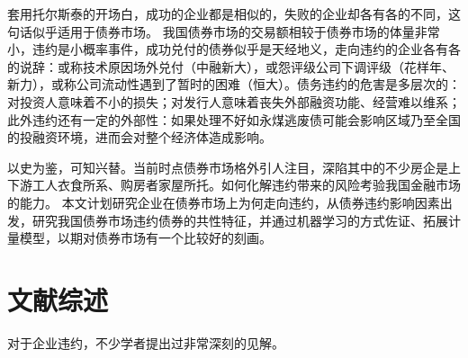 套用托尔斯泰的开场白，成功的企业都是相似的，失败的企业却各有各的不同，这句话似乎适用于债券市场。
我国债券市场的交易额相较于债券市场的体量非常小，违约是小概率事件，成功兑付的债券似乎是天经地义，走向违约的企业各有各的说辞：或称技术原因场外兑付（中融新大），或怨评级公司下调评级（花样年、新力），或称公司流动性遇到了暂时的困难（恒大）。债务违约的危害是多层次的：对投资人意味着不小的损失；对发行人意味着丧失外部融资功能、经营难以维系；此外违约还有一定的外部性：如果处理不好如永煤逃废债可能会影响区域乃至全国的投融资环境，进而会对整个经济体造成影响。

以史为鉴，可知兴替。当前时点债券市场格外引人注目，深陷其中的不少房企是上下游工人衣食所系、购房者家屋所托。如何化解违约带来的风险考验我国金融市场的能力。
本文计划研究企业在债券市场上为何走向违约，从债券违约影响因素出发，研究我国债券市场违约债券的共性特征，并通过机器学习的方式佐证、拓展计量模型，以期对债券市场有一个比较好的刻画。

\section{文献综述}
\label{sec:zs}
对于企业违约，不少学者提出过非常深刻的见解。

